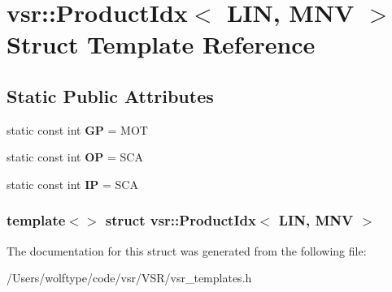\hypertarget{structvsr_1_1_product_idx_3_01_l_i_n_00_01_m_n_v_01_4}{\section{vsr\-:\-:Product\-Idx$<$ L\-I\-N, M\-N\-V $>$ Struct Template Reference}
\label{structvsr_1_1_product_idx_3_01_l_i_n_00_01_m_n_v_01_4}
}
\subsection*{Static Public Attributes}
\begin{DoxyCompactItemize}
\item 
\hypertarget{structvsr_1_1_product_idx_3_01_l_i_n_00_01_m_n_v_01_4_a78c39dc22c685e3d6e3827887c17a971}{static const int {\bfseries G\-P} = M\-O\-T}\label{structvsr_1_1_product_idx_3_01_l_i_n_00_01_m_n_v_01_4_a78c39dc22c685e3d6e3827887c17a971}

\item 
\hypertarget{structvsr_1_1_product_idx_3_01_l_i_n_00_01_m_n_v_01_4_a48098edc2ac6c8d5c9a89311f51141d2}{static const int {\bfseries O\-P} = S\-C\-A}\label{structvsr_1_1_product_idx_3_01_l_i_n_00_01_m_n_v_01_4_a48098edc2ac6c8d5c9a89311f51141d2}

\item 
\hypertarget{structvsr_1_1_product_idx_3_01_l_i_n_00_01_m_n_v_01_4_a9a1ab9767a8293a81454770e4cb9121c}{static const int {\bfseries I\-P} = S\-C\-A}\label{structvsr_1_1_product_idx_3_01_l_i_n_00_01_m_n_v_01_4_a9a1ab9767a8293a81454770e4cb9121c}

\end{DoxyCompactItemize}
\subsubsection*{template$<$$>$ struct vsr\-::\-Product\-Idx$<$ L\-I\-N, M\-N\-V $>$}



The documentation for this struct was generated from the following file\-:\begin{DoxyCompactItemize}
\item 
/\-Users/wolftype/code/vsr/\-V\-S\-R/vsr\-\_\-templates.\-h\end{DoxyCompactItemize}
